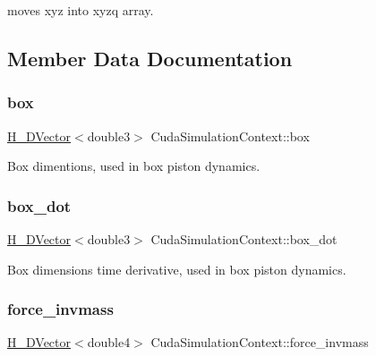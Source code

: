 moves xyz into xyzq array. 



\subsection{Member Data Documentation}
\hypertarget{classCudaSimulationContext_ab27a6d240361a27759e006728024e319}{}\label{classCudaSimulationContext_ab27a6d240361a27759e006728024e319} 
\subsubsection{\texorpdfstring{box}{box}}
{\footnotesize\ttfamily \hyperlink{structH__DVector}{H\+\_\+\+D\+Vector}$<$double3$>$ Cuda\+Simulation\+Context\+::box}



Box dimentions, used in box piston dynamics. 

\hypertarget{classCudaSimulationContext_a2482b59305a454850b0d7d3e25f5830c}{}\label{classCudaSimulationContext_a2482b59305a454850b0d7d3e25f5830c} 
\subsubsection{\texorpdfstring{box\+\_\+dot}{box\_dot}}
{\footnotesize\ttfamily \hyperlink{structH__DVector}{H\+\_\+\+D\+Vector}$<$double3$>$ Cuda\+Simulation\+Context\+::box\+\_\+dot}



Box dimensions time derivative, used in box piston dynamics. 

\hypertarget{classCudaSimulationContext_a861cbb2252066e6ed93a08d3dc908443}{}\label{classCudaSimulationContext_a861cbb2252066e6ed93a08d3dc908443} 
\subsubsection{\texorpdfstring{force\+\_\+invmass}{force\_invmass}}
{\footnotesize\ttfamily \hyperlink{structH__DVector}{H\+\_\+\+D\+Vector}$<$double4$>$ Cuda\+Simulation\+Context\+::force\+\_\+invmass}



